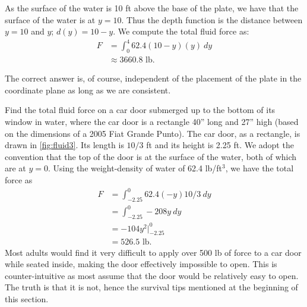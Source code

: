 \begin{example}
\begin{enumerate}
	As the surface of the water is 10 ft above the base of the plate, we have that the surface of the water is at $y=10$. Thus the depth function is the distance between $y=10$ and $y$; $d(y) = 10-y$. We compute the total fluid force as:
	\begin{align*}
	F	&=\int_0^4 62.4(10-y)(y)\ dy \\
		&\approx 3660.8\text{ lb}.
	\end{align*}
\end{enumerate}
The correct answer is, of course, independent of the placement of the plate in the coordinate plane as long as we are consistent.
\end{example}

\begin{example}\label{ex_fluid3}
Find the total fluid force on a car door submerged up to the bottom of its window in water, where the car door is a rectangle 40'' long and 27'' high (based on the dimensions of a 2005 Fiat Grande Punto).
\solution
The car door, as a rectangle, is drawn in \autoref{fig:fluid3}. Its length is $10/3$ ft and its height is 2.25 ft. We adopt the convention that the top of the door is at the surface of the water, both of which are at $y=0$. Using the weight-density of water of 62.4 lb/ft$^3$, we have the total force as
%
%
\begin{align*}
	F &=	\int_{-2.25}^0 62.4(-y)10/3\ dy \\
	&= 	\int_{-2.25}^0 -208y\ dy\\
	&= -104y^2\Big|_{-2.25}^0 \\
	&=	526.5 \text{ lb.}
\end{align*}
Most adults would find it very difficult to apply over 500 lb of force to a car door while seated inside, making the door effectively impossible to open. This  is  counter-intuitive as most assume that the door would be relatively easy to open. The truth is that it is not, hence the survival tips mentioned at the beginning of this section.
\end{example}

